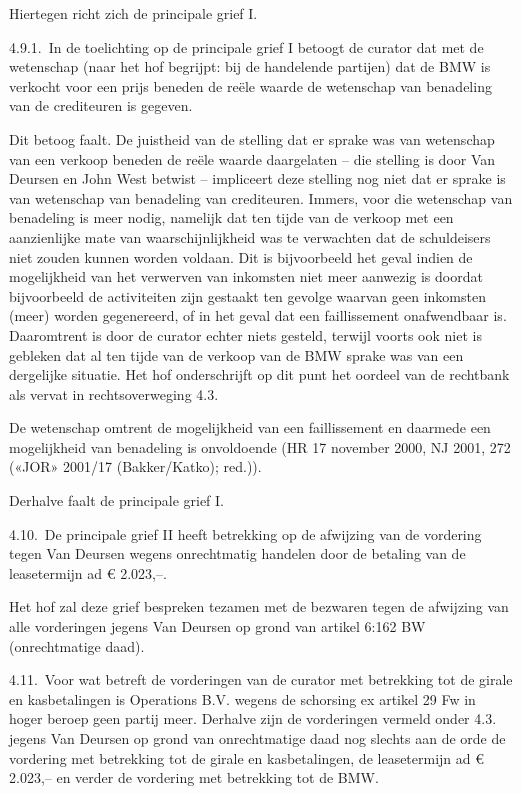 \documentclass[
  dutch,
  a4paper,
]{article}
\begin{document}
Hiertegen richt zich de principale grief I.

4.9.1. In de toelichting op de principale grief I betoogt de curator dat met de wetenschap (naar het hof begrijpt: bij de handelende partijen) dat de BMW is verkocht voor een prijs beneden de reële waarde de wetenschap van benadeling van de crediteuren is gegeven.

Dit betoog faalt. De juistheid van de stelling dat er sprake was van wetenschap van een verkoop beneden de reële waarde daargelaten -- die stelling is door Van Deursen en John West betwist -- impliceert deze stelling nog niet dat er sprake is van wetenschap van benadeling van crediteuren. Immers, voor die wetenschap van benadeling is meer nodig, namelijk dat ten tijde van de verkoop met een aanzienlijke mate van waarschijnlijkheid was te verwachten dat de schuldeisers niet zouden kunnen worden voldaan. Dit is bijvoorbeeld het geval indien de mogelijkheid van het verwerven van inkomsten niet meer aanwezig is doordat bijvoorbeeld de activiteiten zijn gestaakt ten gevolge waarvan geen inkomsten (meer) worden gegenereerd, of in het geval dat een faillissement onafwendbaar is. Daaromtrent is door de curator echter niets gesteld, terwijl voorts ook niet is gebleken dat al ten tijde van de verkoop van de BMW sprake was van een dergelijke situatie. Het hof onderschrijft op dit punt het oordeel van de rechtbank als vervat in rechtsoverweging 4.3.

De wetenschap omtrent de mogelijkheid van een faillissement en daarmede een mogelijkheid van benadeling is onvoldoende (HR 17 november 2000, NJ 2001, 272 («JOR» 2001/17 (Bakker/Katko); red.)).

Derhalve faalt de principale grief I.

4.10. De principale grief II heeft betrekking op de afwijzing van de vordering tegen Van Deursen wegens onrechtmatig handelen door de betaling van de leasetermijn ad € 2.023,--.

Het hof zal deze grief bespreken tezamen met de bezwaren tegen de afwijzing van alle vorderingen jegens Van Deursen op grond van artikel 6:162 BW (onrechtmatige daad).

4.11. Voor wat betreft de vorderingen van de curator met betrekking tot de girale en kasbetalingen is Operations B.V. wegens de schorsing ex artikel 29 Fw in hoger beroep geen partij meer. Derhalve zijn de vorderingen vermeld onder 4.3. jegens Van Deursen op grond van onrechtmatige daad nog slechts aan de orde de vordering met betrekking tot de girale en kasbetalingen, de leasetermijn ad € 2.023,-- en verder de vordering met betrekking tot de BMW.
\end{document}
